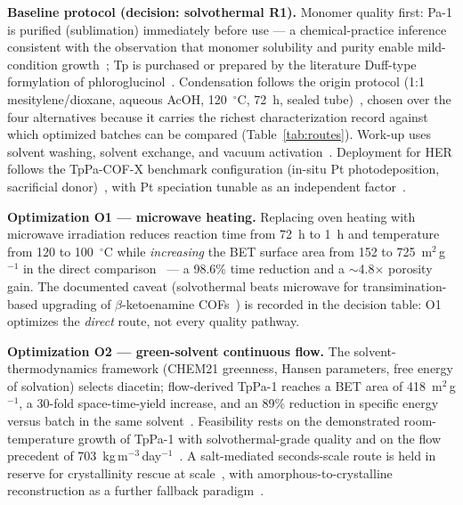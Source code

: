 \textbf{Baseline protocol (decision: solvothermal R1).} Monomer quality first: Pa-1 is
purified (sublimation) immediately before use --- a chemical-practice inference consistent with
the observation that monomer solubility and purity enable mild-condition
growth~\cite{peng2016room}; Tp is purchased or prepared by the literature Duff-type formylation
of phloroglucinol~\cite{kandambeth2012construction}. Condensation follows the origin protocol
(1:1 mesitylene/dioxane, aqueous AcOH, 120~$^\circ$C, 72~h, sealed
tube)~\cite{kandambeth2012construction}, chosen over the four alternatives because it carries
the richest characterization record against which optimized batches can be compared
(Table~\ref{tab:routes}). Work-up uses solvent washing, solvent exchange, and vacuum
activation~\cite{kandambeth2012construction,karak2017constructing}. Deployment for HER follows
the TpPa-COF-X benchmark configuration (in-situ Pt photodeposition, sacrificial
donor)~\cite{sheng2019effect}, with Pt speciation tunable as an independent
factor~\cite{dong2021platinum,li2022in}.

\textbf{Optimization O1 --- microwave heating.} Replacing oven heating with microwave
irradiation reduces reaction time from 72~h to 1~h and temperature from 120 to 100~$^\circ$C
while \emph{increasing} the BET surface area from 152 to 725~m$^2$\,g$^{-1}$ in the direct
comparison~\cite{wei2015the,grenu2020microwave} --- a 98.6\% time reduction and a
$\sim$4.8$\times$ porosity gain. The documented caveat (solvothermal beats microwave for
transimination-based upgrading of $\beta$-ketoenamine COFs~\cite{grenu2020microwave}) is
recorded in the decision table: O1 optimizes the \emph{direct} route, not every quality
pathway.

\textbf{Optimization O2 --- green-solvent continuous flow.} The solvent-thermodynamics
framework (CHEM21 greenness, Hansen parameters, free energy of solvation) selects diacetin;
flow-derived TpPa-1 reaches a BET area of 418~m$^2$\,g$^{-1}$, a 30-fold space-time-yield
increase, and an 89\% reduction in specific energy versus batch in the same
solvent~\cite{xu2026structural}. Feasibility rests on the demonstrated room-temperature growth
of TpPa-1 with solvothermal-grade quality and on the flow precedent of
703~kg\,m$^{-3}$\,day$^{-1}$~\cite{peng2016room}. A salt-mediated seconds-scale route is held
in reserve for crystallinity rescue at scale~\cite{karak2017constructing}, with
amorphous-to-crystalline reconstruction as a further fallback
paradigm~\cite{zhang2022reconstructed}.

